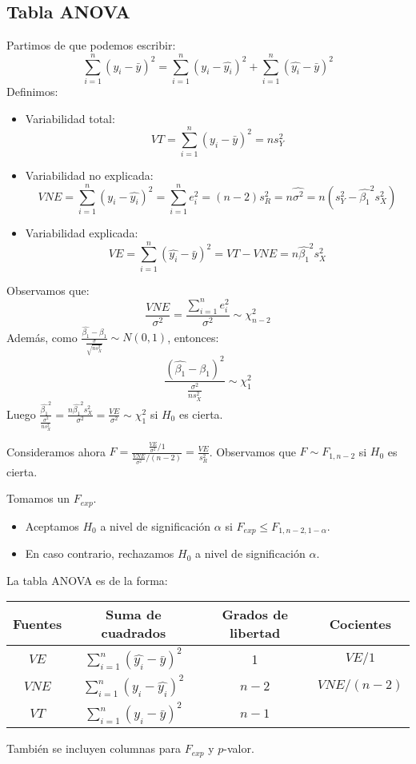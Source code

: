 \documentclass{report}
\theoremstyle{remark}
\theoremstyle{remark}
\theoremstyle{remark}
\theoremstyle{definition}
\theoremstyle{definition}
\theoremstyle{definition}
\begin{document}
\subsection*{Tabla ANOVA}
Partimos de que podemos escribir:
$$\sum_{i=1}^n (y_i - \bar{y})^2 = \sum_{i=1}^n (y_i - \hat{y_i})^2 + \sum_{i=1}^n (\hat{y_i} - \bar{y})^2$$
Definimos:
\begin{itemize}
    \item Variabilidad total:
          $$VT = \sum_{i=1}^n (y_i - \bar{y})^2 = ns_Y^2$$
    \item Variabilidad no explicada:
          $$VNE = \sum_{i=1}^n (y_i - \hat{y_i})^2 = \sum_{i=1}^n e_i^2 = (n-2)s_R^2 = n\hat{\sigma^2} = n(s_Y^2 - \hat{\beta_1}^2s_X^2)$$
    \item Variabilidad explicada:
          $$VE = \sum_{i=1}^n (\hat{y_i} - \bar{y})^2 = VT - VNE = n\hat{\beta_1}^2 s_X^2$$
\end{itemize}
Observamos que:
$$\frac{VNE}{\sigma^2} = \frac{\sum_{i=1}^n e_i^2}{\sigma^2} \sim \chi^2_{n-2}$$
Además, como $\frac{\hat{\beta_1} - \beta_1}{\frac{\sigma}{\sqrt{ns_X^2}}} \sim N(0,1)$, entonces:
$$\frac{(\hat{\beta_1} - \beta_1)^2}{\frac{\sigma^2}{ns_X^2}} \sim \chi^2_1$$
Luego $\frac{\hat{\beta_1}^2}{\frac{\sigma^2}{ns_X^2}} = \frac{n\hat{\beta_1}^2s_X^2}{\sigma^2} = \frac{VE}{\sigma^2} \sim \chi^2_1$ si $H_0$ es cierta.

Consideramos ahora $F = \frac{\frac{VE}{\sigma^2} / 1}{\frac{VNE}{\sigma^2} / (n-2)} = \frac{VE}{s_R^2}$.
Observamos que $F \sim F_{1, n-2}$ si $H_0$ es cierta.

Tomamos un $F_{exp}$.
\begin{itemize}
    \item Aceptamos $H_0$ a nivel de significación $\alpha$ si $F_{exp} \leq F_{1, n-2, 1-\alpha}$.
    \item En caso contrario, rechazamos $H_0$ a nivel de significación $\alpha$.
\end{itemize}

La tabla ANOVA es de la forma:
\begin{center}
    \begin{tabular}{| c | c | c | c |}
        \hline
        Fuentes & Suma de cuadrados                   & Grados de libertad & Cocientes   \\
        \hline
        $VE$    & $\sum_{i=1}^n(\hat{y_i}-\bar{y})^2$ & 1                  & $VE/1$      \\
        $VNE$   & $\sum_{i=1}^n(y_i - \hat{y_i})^2$   & $n-2$              & $VNE/(n-2)$ \\
        $VT$    & $\sum_{i=1}^n(y_i - \bar{y})^2$     & $n-1$              &             \\
        \hline
    \end{tabular}
\end{center}
También se incluyen columnas para $F_{exp}$ y $p$-valor.
\end{document}
